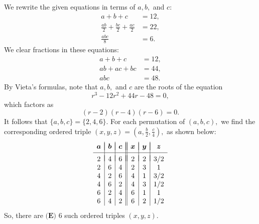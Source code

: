\begin{enumerate}
 We rewrite the given equations in terms of $a,b,$ and $c:$
 \begin{align*} a + b + c &= 12, \\ \frac{ab}{2} + \frac{bc}{2} + \frac{ac}{2} &= 22, \\ \frac{abc}{8} &= 6. \end{align*}
We clear fractions in these equations:
 \begin{align*} a + b + c &= 12, \\ ab + ac + bc &= 44, \\ abc &= 48. \end{align*}
By Vieta's formulas, note that $a,b,$ and $c$ are the roots of the equation 
 \[r^3 - 12r^2 + 44r - 48 = 0,\]which factors as
 \[(r - 2)(r - 4)(r - 6) = 0.\]It follows that $\{a,b,c\}=\{2,4,6\}.$ For each permutation of $(a,b,c),$ we find the corresponding ordered triple $(x,y,z)=\left(a,\frac b2,\frac c4\right),$ as shown below:
 \[\begin{array}{c|c|c||c|c|c} & & & & & \\ [-2.5ex] \boldsymbol{a} & \boldsymbol{b} & \boldsymbol{c} & \boldsymbol{x} & \boldsymbol{y} & \boldsymbol{z} \\ [0.5ex] \hline & & & & & \\ [-2ex] 2 & 4 & 6 & 2 & 2 & 3/2 \\ 2 & 6 & 4 & 2 & 3 & 1 \\ 4 & 2 & 6 & 4 & 1 & 3/2 \\ 4 & 6 & 2 & 4 & 3 & 1/2 \\ 6 & 2 & 4 & 6 & 1 & 1 \\ 6 & 4 & 2 & 6 & 2 & 1/2 \end{array}\]So, there are $\boxed{\textbf{(E) }6}$ such ordered triples $(x,y,z).$



\end{enumerate}
